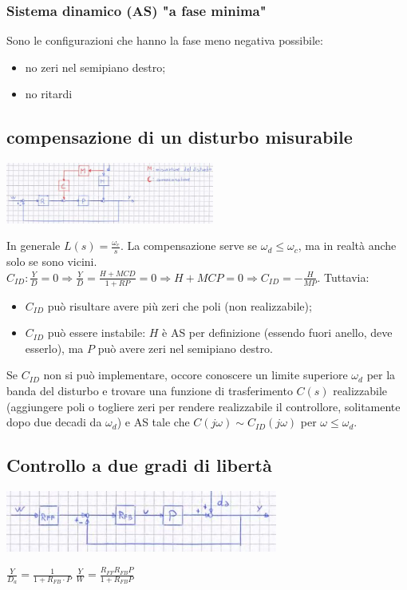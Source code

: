 \begin{landscape}
\begin{multicols*}{3}
    \subsubsection*{Sistema dinamico (AS) "a fase minima"}
    Sono le configurazioni che hanno la fase meno negativa possibile:
    \begin{itemize}
        \item no zeri nel semipiano destro;
        \item no ritardi
    \end{itemize}
    \subsection*{compensazione di un disturbo misurabile}
    \begin{center}
        \includegraphics[height=2cm]{../formulario/img4.JPG}
    \end{center}
    In generale $L(s) = \frac{\omega_c}{s}$.\newline
    \newline
    La compensazione serve se $\omega_d \leq \omega_c$, ma in realtà anche solo se sono vicini.\newline
    $C_{ID}: \frac{Y}{D} = 0 \Rightarrow \frac{Y}{D} = \frac{H + MCD}{1+RP} = 0 \Rightarrow H + MCP = 0 \Rightarrow C_{ID} = - \frac{H}{MP}$.\newline
    Tuttavia:
    \begin{itemize}
        \item $C_{ID}$ può risultare avere più zeri che poli (non realizzabile);
        \item $C_{ID}$ può essere instabile: $H$ è AS per definizione (essendo fuori anello, deve esserlo), ma $P$ può avere zeri nel semipiano destro.
    \end{itemize} 
    Se $C_{ID}$ non si può implementare, occore conoscere un limite superiore $\omega_d$ per la banda del disturbo e trovare una funzione di trasferimento $C(s)$ realizzabile (aggiungere poli o togliere zeri per rendere realizzabile il controllore, solitamente dopo due decadi da $\omega_d$) e AS tale che $C(j \omega) \sim C_{ID} (j \omega)$ per $\omega \leq \omega_d$.
    \subsection*{Controllo a due gradi di libertà}
    \begin{center}
        \includegraphics[height=2cm]{../formulario/img5.JPG}
    \end{center}
    $\frac{Y}{D_a} = \frac{1}{1+R_{FB} \cdot P}$\newline
    $\frac{Y}{W} = \frac{R_{FF} R_{FB} P}{1 + R_{FB} P}$

\end{multicols*}
\end{landscape}
